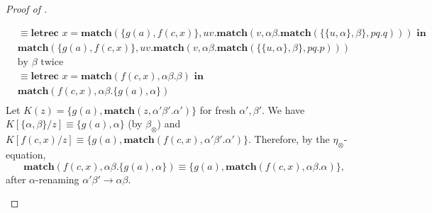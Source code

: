 \begin{proof}[Proof of ]
\begin{itemize}
\begin{align*}
&\equiv \textbf{letrec } x = \textbf{match}(\{g(a),f(c,x)\}, uv.\textbf{match}(v,\alpha\beta.\textbf{match}(\{\{u,\alpha\}, \beta\}, pq.q))) \textbf{ in }\\
&\textbf{match}(\{g(a),f(c,x)\}, uv.\textbf{match}(v,\alpha\beta.\textbf{match}(\{\{u,\alpha\}, \beta\}, pq.p)))\\
&\text{by $\beta$ twice}\\
&\equiv \textbf{letrec } x = \textbf{match}(f(c,x), \alpha\beta.\beta) \textbf{ in }\\
&\textbf{match}(f(c,x),\alpha\beta.\{g(a), \alpha\})\\
\end{align*}
Let $K(z) = \{g(a), \textbf{match}(z, \alpha'\beta'.\alpha')\}$ for fresh $\alpha', \beta'$.
We have $K[\{\alpha,\beta\}/z] \equiv \{g(a), \alpha\}$ (by $\beta_\otimes$) and 
$K[f(c,x)/z] \equiv \{g(a), \textbf{match}(f(c,x), \alpha'\beta'.\alpha')\}$.
Therefore, by the $\eta_\otimes$-equation,
\[
\textbf{match}(f(c,x), \alpha\beta.\{g(a), \alpha\}) \equiv \{g(a), \textbf{match}(f(c,x), \alpha\beta.\alpha)\},
\]
\textnormal{after $\alpha$-renaming $\alpha'\beta' \to \alpha\beta$.}


\end{itemize}
\end{proof}
